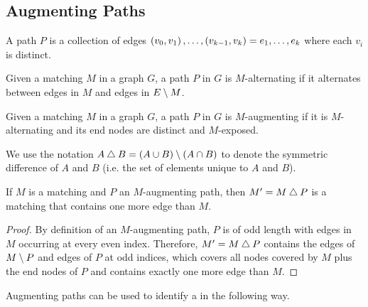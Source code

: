 \subsection{Augmenting Paths}

A path $P$ is a collection of edges $\left( v_0, v_1 \right), \ldots, \left( v_{k-1}, v_k \right) = e_1, \ldots, e_k $ where each $v_i$ is distinct.   

\begin{definition}
    Given a matching $M$ in a graph $G$, a path $P$ in $G$ is $M$-alternating if it alternates
    between edges in $M$ and edges in $E \setminus M$. 
    \label{def:alternate_path}
\end{definition}

\begin{definition}
    Given a matching $M$ in a graph $G$, a path $P$ in $G$ is $M$-augmenting if it is $M$-alternating and  
    its end nodes are distinct and $M$-exposed. 
    \label{def:augment_path}
\end{definition}

We use the notation $A \bigtriangleup B = \left( A \cup  B \right) \setminus \left( A \cap B \right)$ to denote the symmetric difference of $A$ and $B$
(i.e.\! the set of elements unique to $A$ and $B$).
\begin{lemma}
    If $M$ is a matching and $P$ an $M$-augmenting path, then $M^\prime = M \bigtriangleup P$ is a matching that 
    contains one more edge than $M$. 
    \label{lem:augment_path_matching}
\end{lemma}
\begin{proof}
    By definition of an $M$-augmenting path, $P$ is of odd length with edges in $M$ occurring at every even index. 
    Therefore, $M^\prime = M \bigtriangleup P$ contains the edges of $M \setminus P$ and edges of $P$ at odd indices, which covers all nodes covered by $M$ plus the end nodes of $P$ 
    and contains exactly one more edge than $M$. 
\end{proof}

Augmenting paths can be used to identify a \maxcardmatch{} in the following way. 

